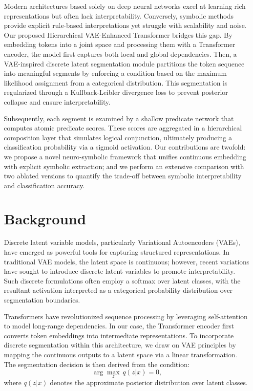 \documentclass{article}
\begin{document}
Modern architectures based solely on deep neural networks excel at learning rich representations but often lack interpretability. Conversely, symbolic methods provide explicit rule-based interpretations yet struggle with scalability and noise. Our proposed Hierarchical VAE-Enhanced Transformer bridges this gap. By embedding tokens into a joint space and processing them with a Transformer encoder, the model first captures both local and global dependencies. Then, a VAE-inspired discrete latent segmentation module partitions the token sequence into meaningful segments by enforcing a condition based on the maximum likelihood assignment from a categorical distribution. This segmentation is regularized through a Kullback-Leibler divergence loss to prevent posterior collapse and ensure interpretability.

Subsequently, each segment is examined by a shallow predicate network that computes atomic predicate scores. These scores are aggregated in a hierarchical composition layer that simulates logical conjunction, ultimately producing a classification probability via a sigmoid activation. Our contributions are twofold: we propose a novel neuro-symbolic framework that unifies continuous embedding with explicit symbolic extraction; and we perform an extensive comparison with two ablated versions to quantify the trade-off between symbolic interpretability and classification accuracy.

\section{Background}
Discrete latent variable models, particularly Variational Autoencoders (VAEs), have emerged as powerful tools for capturing structured representations. In traditional VAE models, the latent space is continuous; however, recent variations have sought to introduce discrete latent variables to promote interpretability. Such discrete formulations often employ a softmax over latent classes, with the resultant activation interpreted as a categorical probability distribution over segmentation boundaries.

Transformers have revolutionized sequence processing by leveraging self-attention to model long-range dependencies. In our case, the Transformer encoder first converts token embeddings into intermediate representations. To incorporate discrete segmentation within this architecture, we draw on VAE principles by mapping the continuous outputs to a latent space via a linear transformation. The segmentation decision is then derived from the condition:
\[
\arg\max_{z} \, q(z|x) = 0,
\]
where $q(z|x)$ denotes the approximate posterior distribution over latent classes.
\end{document}
